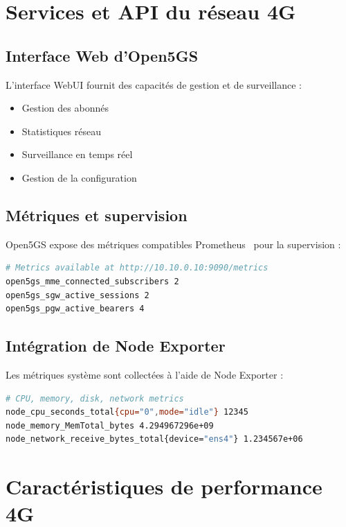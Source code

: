 \documentclass[12pt,a4paper]{report}
\begin{document}
\section{Services et API du réseau 4G}

\subsection{Interface Web d'Open5GS}

L'interface WebUI fournit des capacités de gestion et de surveillance :

\begin{itemize}
    \item Gestion des abonnés
    \item Statistiques réseau
    \item Surveillance en temps réel
    \item Gestion de la configuration
\end{itemize}

\subsection{Métriques et supervision}

Open5GS expose des métriques compatibles Prometheus~\cite{prometheus-docs} pour la supervision :

\begin{lstlisting}[caption=Point d'accès métriques Open5GS, language=bash]
# Metrics available at http://10.10.0.10:9090/metrics
open5gs_mme_connected_subscribers 2
open5gs_sgw_active_sessions 2
open5gs_pgw_active_bearers 4
\end{lstlisting}

\subsection{Intégration de Node Exporter}

Les métriques système sont collectées à l'aide de Node Exporter :

\begin{lstlisting}[caption=Métriques Node Exporter, language=bash]
# CPU, memory, disk, network metrics
node_cpu_seconds_total{cpu="0",mode="idle"} 12345
node_memory_MemTotal_bytes 4.294967296e+09
node_network_receive_bytes_total{device="ens4"} 1.234567e+06
\end{lstlisting}

\section{Caractéristiques de performance 4G}
\end{document}
